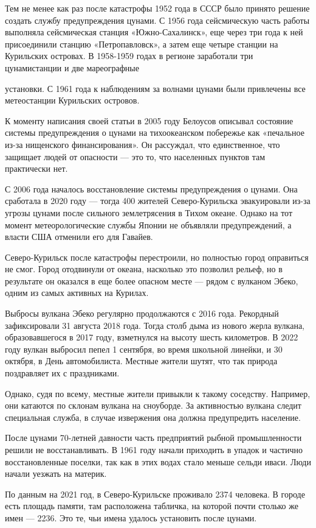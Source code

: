 Тем не менее как раз после катастрофы 1952 года в СССР было принято решение создать службу предупреждения цунами. С 1956 года сейсмическую часть работы выполняла сейсмическая станция «Южно-Сахалинск», еще через три года к ней присоединили станцию «Петропавловск», а затем еще четыре станции на Курильских островах. В 1958-1959 годах в регионе заработали три цунамистанции и две мареографные

установки. С 1961 года к наблюдениям за волнами цунами были привлечены все метеостанции Курильских островов.

К моменту написания своей статьи в 2005 году Белоусов описывал состояние системы предупреждения о цунами на тихоокеанском побережье как «печальное из-за нищенского финансирования». Он рассуждал, что единственное, что защищает людей от опасности --- это то, что населенных пунктов там практически нет.

С 2006 года началось восстановление системы предупреждения о цунами. Она сработала в 2020 году --- тогда 400 жителей Северо-Курильска эвакуировали из-за угрозы цунами после сильного землетрясения в Тихом океане. Однако на тот момент метеорологические службы Японии не объявляли предупреждений, а власти США отменили его для Гавайев.

Северо-Курильск после катастрофы перестроили, но полностью город оправиться не смог. Город отодвинули от океана, насколько это позволил рельеф, но в результате он оказался в еще более опасном месте --- рядом с вулканом Эбеко, одним из самых активных на Курилах.

Выбросы вулкана Эбеко регулярно продолжаются с 2016 года. Рекордный зафиксировали 31 августа 2018 года. Тогда столб дыма из нового жерла вулкана, образовавшегося в 2017 году, взметнулся на высоту шесть километров. В 2022 году вулкан выбросил пепел 1 сентября, во время школьной линейки, и 30 октября, в День автомобилиста. Местные жители шутят, что так природа поздравляет их с праздниками.

Однако, судя по всему, местные жители привыкли к такому соседству. Например, они катаются по склонам вулкана на сноуборде. За активностью вулкана следит специальная служба, в случае извержения она должна предупредить население.

После цунами 70-летней давности часть предприятий рыбной промышленности решили не восстанавливать. В 1961 году начали приходить в упадок и частично восстановленные поселки, так как в этих водах стало меньше сельди иваси. Люди начали уезжать на материк.

По данным на 2021 год, в Северо-Курильске проживало 2374 человека. В городе есть площадь памяти, там расположена табличка, на которой почти столько же имен --- 2236. Это те, чьи имена удалось установить после цунами.

